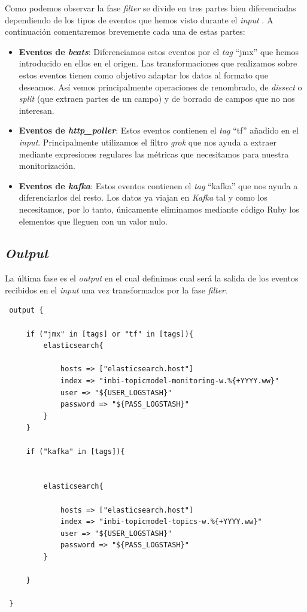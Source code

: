 Como podemos observar la fase \textit{filter} se divide en tres partes bien diferenciadas dependiendo de los tipos de eventos que hemos visto durante el \textit{input} . A continuación comentaremos brevemente cada una de estas partes: 

\begin{itemize}
\item \textbf{Eventos de \textit{beats}}:  Diferenciamos estos eventos por el \textit{tag} ``jmx'' que hemos introducido en ellos en el origen. Las transformaciones que realizamos sobre estos eventos tienen como objetivo adaptar los datos al formato que deseamos. Así vemos principalmente operaciones de renombrado, de \textit{dissect} o \textit{split} (que extraen partes de un campo)  y de borrado de campos que no nos interesan. 

\item \textbf{Eventos de \textit{http\_poller}}: Estos eventos contienen el \textit{tag} ``tf'' añadido en el \textit{\textit{input}}. Principalmente utilizamos el filtro \textit{grok} que nos ayuda a extraer mediante expresiones regulares las métricas que necesitamos para nuestra monitorización.

\item \textbf{Eventos de \textit{kafka}}: Estos eventos contienen el \textit{tag} ``kafka'' que nos ayuda a diferenciarlos del resto. Los datos ya viajan en \textit{Kafka} tal y como los necesitamos, por lo tanto, únicamente eliminamos  mediante código Ruby los elementos que lleguen con un valor nulo.


\end{itemize}



\subsection{\textit{Output}}

La última fase es el \textit{output} en el cual definimos cual será la salida de los eventos recibidos en el \textit{input} una vez transformados por la fase \textit{filter}.


\begin{verbatim}
 output {
 
     if ("jmx" in [tags] or "tf" in [tags]){
         elasticsearch{
         
             hosts => ["elasticsearch.host"]
             index => "inbi-topicmodel-monitoring-w.%{+YYYY.ww}"
             user => "${USER_LOGSTASH}"
             password => "${PASS_LOGSTASH}"
         }
     }
 
     if ("kafka" in [tags]){
     
         
         elasticsearch{
         
             hosts => ["elasticsearch.host"]
             index => "inbi-topicmodel-topics-w.%{+YYYY.ww}"
             user => "${USER_LOGSTASH}"
             password => "${PASS_LOGSTASH}"
         }
         
     }
     
 }	
 	
\end{verbatim}

